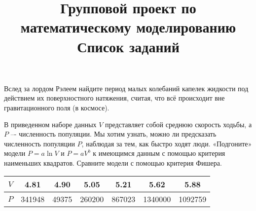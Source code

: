 


\title{Групповой проект по математическому моделированию\\
\vspace{10pt}
\Large Список заданий}
\date{}


\maketitle

 Вслед за лордом Рэлеем найдите период малых колебаний капелек жидкости под действием их поверхностного натяжения, считая, что всё происходит вне гравитационного поля (в космосе).\par

 В приведенном наборе данных $V$ представляет собой среднюю скорость ходьбы, а $P$ –- численность популяции. Мы хотим узнать, можно ли предсказать численность популяции $P$, наблюдая за тем, как быстро ходят люди. «Подгоните» модели $P=a \ln V$ и $P=aV^b$ к имеющимся данным с помощью критерия наименьших квадратов. Сравните модели с помощью критерия Фишера.\par

\begin{center}
\begin{tabular}{ |c|c|c|c|c|c|c| }
\hline
$V$ & 4.81 & 4.90 & 5.05 & 5.21 & 5.62 & 5.88\\
\hline
$P$ & 341948 & 49375 & 260200 & 867023 & 1340000 & 1092759\\
\hline
\end{tabular}
\end{center}

